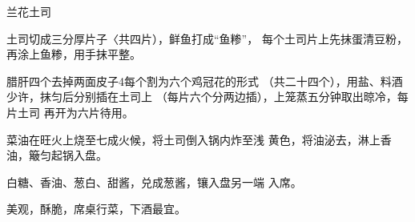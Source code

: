 \begin{recipe}{兰花土司}

\ingredients


\cooking

土司切成三分厚片子〈共四片），鲜鱼打成“鱼糁”， 每个土司片上先抹蛋清豆粉，再涂上鱼糁，用手抹平整。

\step 腊肝四个去掉两面皮子4每个割为六个鸡冠花的形式 （共二十四个），用盐、料酒少许，抹匀后分别插在土司上 （每片六个分两边插），上笼蒸五分钟取出晾冷，每片土司 再开为六片待用。

菜油在旺火上烧至七成火候，将土司倒入锅内炸至浅 黄色，将油泌去，淋上香油，簸匀起锅入盘。

\step 白糖、香油、葱白、甜酱，兑成葱酱，镶入盘另一端 入席。

\notes

美观，酥脆，席桌行菜，下酒最宜。

\end{recipe}

